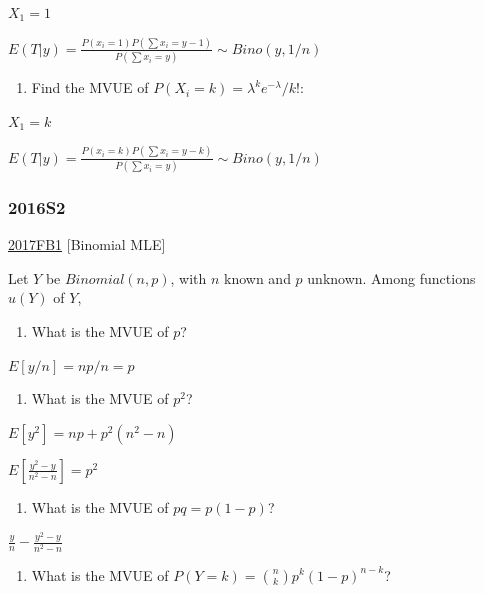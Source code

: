 \documentclass[10pt,twocolumn,portrait]{article}
\providecommand{\tightlist}{%
  \setlength{\itemsep}{0pt}\setlength{\parskip}{0pt}}
\begin{document}
\(X_1=1\)

\(E(T|y)=\frac{P(x_i=1)P(\sum x_i=y-1)}{P(\sum x_i=y)} \sim Bino(y,1/n)\)

\begin{enumerate}
\def\labelenumi{(\alph{enumi})}
\setcounter{enumi}{5}
\tightlist
\item
  Find the MVUE of \(P(X_i=k)=\lambda^ke^{-\lambda}/k!\):
\end{enumerate}

\(X_1=k\)

\(E(T|y)=\frac{P(x_i=k)P(\sum x_i=y-k)}{P(\sum x_i=y)} \sim Bino(y,1/n)\)

\hypertarget{s2-4}{%
\subsubsection{2016S2}\label{s2-4}}

\protect\hyperlink{fb1-3}{2017FB1} {[}Binomial MLE{]}

Let \(Y\) be \(Binomial(n,p)\), with \(n\) known and \(p\) unknown.
Among functions \(u(Y)\) of \(Y\),

\begin{enumerate}
\def\labelenumi{(\alph{enumi})}
\tightlist
\item
  What is the MVUE of \(p\)?
\end{enumerate}

\(E[y/n]=np/n=p\)

\begin{enumerate}
\def\labelenumi{(\alph{enumi})}
\setcounter{enumi}{1}
\tightlist
\item
  What is the MVUE of \(p^2\)?
\end{enumerate}

\(E[y^2]=np+p^2(n^2-n)\)

\(E[\frac{y^2-y}{n^2-n}]=p^2\)

\begin{enumerate}
\def\labelenumi{(\alph{enumi})}
\setcounter{enumi}{2}
\tightlist
\item
  What is the MVUE of \(pq=p(1-p)\)?
\end{enumerate}

\(\frac{y}n-\frac{y^2-y}{n^2-n}\)

\begin{enumerate}
\def\labelenumi{(\alph{enumi})}
\setcounter{enumi}{3}
\tightlist
\item
  { What is the MVUE of \(P(Y=k)=\binom{n}{k}p^k(1-p)^{n-k}\)?}
\end{enumerate}
\end{document}
